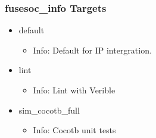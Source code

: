 \subsubsection{fusesoc\_info Targets}
\begin{itemize}
\item default
	\begin{itemize}
	\item[$\space$] Info: Default for IP intergration.
	\end{itemize}
\item lint
	\begin{itemize}
	\item[$\space$] Info: Lint with Verible
	\end{itemize}
\item sim\_cocotb\_full
	\begin{itemize}
	\item[$\space$] Info: Cocotb unit tests
	\end{itemize}
\end{itemize}
